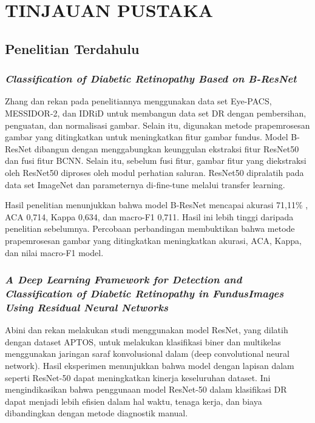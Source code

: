 \chapter{TINJAUAN PUSTAKA}
\label{chap:tinjauanpustaka}


\section{Penelitian Terdahulu}
\label{sec:21}

\subsection{\emph{Classification of Diabetic Retinopathy Based on B-ResNet}}
\label{subsec:211}

Zhang dan rekan \parencite{zhang2022residual} pada penelitiannya menggunakan data set Eye-PACS, MESSIDOR-2, dan IDRiD untuk membangun data set DR dengan pembersihan, penguatan, dan normalisasi gambar. Selain itu, digunakan metode prapemrosesan gambar yang ditingkatkan untuk meningkatkan fitur gambar fundus. Model B-ResNet dibangun dengan menggabungkan keunggulan ekstraksi fitur ResNet50 dan fusi fitur BCNN. Selain itu, sebelum fusi fitur, gambar fitur yang diekstraksi oleh ResNet50 diproses oleh modul perhatian saluran. ResNet50 dipralatih pada data set ImageNet dan parameternya di-fine-tune melalui transfer learning.

Hasil penelitian menunjukkan bahwa model B-ResNet mencapai akurasi 71,11\% , ACA 0,714, Kappa 0,634, dan macro-F1 0,711. Hasil ini lebih tinggi daripada penelitian sebelumnya. Percobaan perbandingan membuktikan bahwa metode prapemrosesan gambar yang ditingkatkan meningkatkan akurasi, ACA, Kappa, dan nilai macro-F1 model.

\subsection{\emph{A Deep Learning Framework for Detection and Classification of Diabetic Retinopathy in FundusImages Using Residual Neural Networks}}
\label{subsec:212}

Abini dan rekan \parencite{10335079} melakukan studi menggunakan model ResNet, yang dilatih dengan dataset APTOS, untuk melakukan klasifikasi biner dan multikelas menggunakan jaringan saraf konvolusional dalam (deep convolutional neural network). Hasil eksperimen menunjukkan bahwa model dengan lapisan dalam seperti ResNet-50 dapat meningkatkan kinerja keseluruhan dataset. Ini mengindikasikan bahwa penggunaan model ResNet-50 dalam klasifikasi DR dapat menjadi lebih efisien dalam hal waktu, tenaga kerja, dan biaya dibandingkan dengan metode diagnostik manual.

